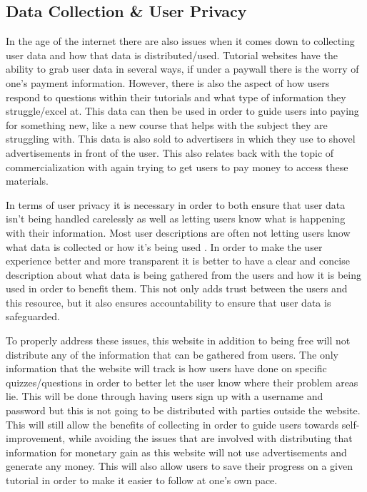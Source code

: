 \documentclass[10pt,twocolumn]{article}
\begin{document}
\subsection{Data Collection \& User Privacy}
In the age of the internet there are also issues when it comes down to collecting user data and how that data is distributed/used. Tutorial websites have the ability to grab user data in several ways, if under a paywall there is the worry of one's payment information. However, there is also the aspect of how users respond to questions within their tutorials and what type of information they struggle/excel at. This data can then be used in order to guide users into paying for something new, like a new course that helps with the subject they are struggling with. This data is also sold to advertisers in which they use to shovel advertisements in front of the user. This also relates back with the topic of commercialization with again trying to get users to pay money to access these materials.


In terms of user privacy it is necessary in order to both ensure that user data isn't being handled carelessly as well as letting users know what is happening with their information. Most user descriptions are often not letting users know what data is collected or how it's being used \cite{kyi_it_2024}. In order to make the user experience better and more transparent it is better to have a clear and concise description about what data is being gathered from the users and how it is being used in order to benefit them. This not only adds trust between the users and this resource, but it also ensures accountability to ensure that user data is safeguarded.


To properly address these issues, this website in addition to being free will not distribute any of the information that can be gathered from users. The only information that the website will track is how users have done on specific quizzes/questions in order to better let the user know where their problem areas lie. This will be done through having users sign up with a username and password but this is not going to be distributed with parties outside the website. This will still allow the benefits of collecting in order to guide users towards self-improvement, while avoiding the issues that are involved with distributing that information for monetary gain as this website will not use advertisements and generate any money. This will also allow users to save their progress on a given tutorial in order to make it easier to follow at one's own pace.
\end{document}
